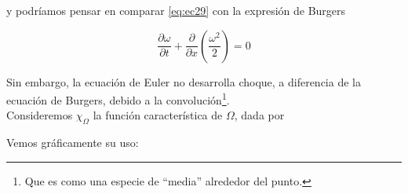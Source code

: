 y podríamos pensar en comparar \eqref{eq:ec29} con la expresión de Burgers

$$\dfrac{\partial \omega}{\partial t} + \dfrac{\partial}{\partial x} \left( \dfrac{\omega^2}{2} \right) = 0$$

Sin embargo, la ecuación de Euler no desarrolla choque, a diferencia de la ecuación de Burgers, debido a la convolución\footnote{Que es como 
una especie de ``media'' alrededor del punto.}. \\

Consideremos $\chi_{\Omega}$ la función característica de $\Omega$, dada por 

Vemos gráficamente su uso:

